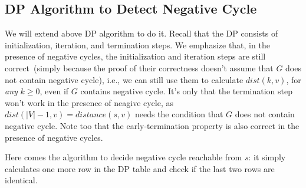 %

\subsection*{DP Algorithm to Detect Negative Cycle}

We will extend above DP algorithm to do it.
Recall that the DP consists of initialization, iteration, and termination steps.
We emphasize that, in the presence of negative cycles, the initialization and iteration
steps are still correct~(simply because the proof of their correctness doesn't assume that $G$ does not contain negative cycle),
i.e., we can still use them to calculate $dist(k,v)$, for \emph{any} $k\ge 0$, even if $G$ contains negative cycle.
It's only that the termination step won't work in the presence of neagive cycle,
as $dist(|V| - 1, v) = distance(s,v)$ needs the condition that $G$ does not contain negative cycle.
Note too that the early-termination property is also correct in the presence of negative cycles.

Here comes the algorithm to decide negative cycle reachable from $s$:
it simply calculates one more row in the DP table and check if the last two rows are identical.

\begin{minipage}{0.8\textwidth}
	\xxx
	\xxx
	\xxx
	\xxx
	\xxx
	\xxx
	\xxx
	\xxx
\end{minipage}

